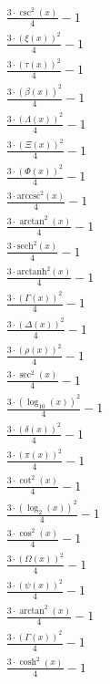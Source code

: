 \begin{equation}
\begin{array}{c}
\frac{3 \cdot \csc^{2}\left( x \right)}{4} - 1 \\
\frac{3 \cdot \left( \xi\left( x \right) \right)^{2}}{4} - 1 \\
\frac{3 \cdot \left( \tau\left( x \right) \right)^{2}}{4} - 1 \\
\frac{3 \cdot \left( \beta\left( x \right) \right)^{2}}{4} - 1 \\
\frac{3 \cdot \left( \Lambda\left( x \right) \right)^{2}}{4} - 1 \\
\frac{3 \cdot \left( \Xi\left( x \right) \right)^{2}}{4} - 1 \\
\frac{3 \cdot \left( \Phi\left( x \right) \right)^{2}}{4} - 1 \\
\frac{3 \cdot \mathrm{arccsc}^{2}\left( x \right)}{4} - 1 \\
\frac{3 \cdot \arctan^{2}\left( x \right)}{4} - 1 \\
\frac{3 \cdot \mathrm{sech}^{2}\left( x \right)}{4} - 1 \\
\frac{3 \cdot \mathrm{arctanh}^{2}\left( x \right)}{4} - 1 \\
\frac{3 \cdot \left( \Gamma\left( x \right) \right)^{2}}{4} - 1 \\
\frac{3 \cdot \left( \Delta\left( x \right) \right)^{2}}{4} - 1 \\
\frac{3 \cdot \left( \rho\left( x \right) \right)^{2}}{4} - 1 \\
\frac{3 \cdot \sec^{2}\left( x \right)}{4} - 1 \\
\frac{3 \cdot \left( \log_{10}\left( x \right) \right)^{2}}{4} - 1 \\
\frac{3 \cdot \left( \delta\left( x \right) \right)^{2}}{4} - 1 \\
\frac{3 \cdot \left( \pi\left( x \right) \right)^{2}}{4} - 1 \\
\frac{3 \cdot \cot^{2}\left( x \right)}{4} - 1 \\
\frac{3 \cdot \left( \log_{2}\left( x \right) \right)^{2}}{4} - 1 \\
\frac{3 \cdot \cos^{2}\left( x \right)}{4} - 1 \\
\frac{3 \cdot \left( \Omega\left( x \right) \right)^{2}}{4} - 1 \\
\frac{3 \cdot \left( \psi\left( x \right) \right)^{2}}{4} - 1 \\
\frac{3 \cdot \arctan^{2}\left( x \right)}{4} - 1 \\
\frac{3 \cdot \left( \Gamma\left( x \right) \right)^{2}}{4} - 1 \\
\frac{3 \cdot \cosh^{2}\left( x \right)}{4} - 1 \\

\end{array}
\end{equation}
